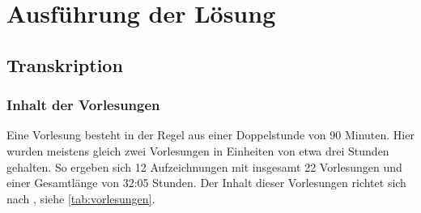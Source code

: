 \chapter{Ausführung der Lösung}\label{ch:solution}

\section{Transkription}

\subsection{Inhalt der Vorlesungen}

Eine Vorlesung besteht in der Regel aus einer Doppelstunde von 90 Minuten.
Hier wurden meistens gleich zwei Vorlesungen in Einheiten von etwa drei Stunden gehalten.
So ergeben sich 12 Aufzeichnungen mit insgesamt 22 Vorlesungen und einer Gesamtlänge von 32:05 Stunden. 
Der Inhalt dieser Vorlesungen richtet sich nach \citet{bb2}, siehe \cref{tab:vorlesungen}.


